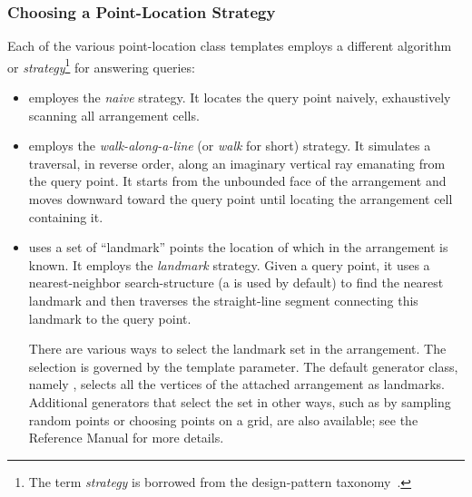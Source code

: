 \subsubsection{Choosing a Point-Location Strategy\label{arr_sssec:pl_strat}}
Each of the various point-location class templates employs a different
algorithm or \emph{strategy}\footnote{The term \emph{strategy}
is borrowed from the design-pattern
taxonomy~\cite[Chapter~5]{ghjv-dp-95}.} for answering queries:
\begin{itemize}
\item {} employes the
  \emph{naive} strategy. It locates the query point naively,
  exhaustively scanning all arrangement cells.
%
\item {} employs
  the \emph{walk-along-a-line} (or \emph{walk} for short) strategy.
  It simulates a traversal, in reverse order, along an imaginary
  vertical ray emanating from the query point. It starts from the
  unbounded face of the arrangement and moves downward toward the
  query point until locating the arrangement cell containing it.
%
\item {}
  uses a set of ``landmark'' points the location of which in the
  arrangement is known. It employs the
  \emph{landmark} strategy. Given a query point, it uses a
  nearest-neighbor search-structure (a \kdtree{} is used by default)
  to find the nearest landmark and then traverses the straight-line
segment connecting this landmark to the query point.

There are various ways to select the landmark set in the
  arrangement. The selection is governed by the 
  template parameter. The default generator class, namely
  , selects all the vertices of
  the attached arrangement as landmarks. Additional generators that
  select the set in other ways, such as by sampling random
  points or choosing points on a grid, are also available; see the
Reference Manual for more details.


\end{itemize}
